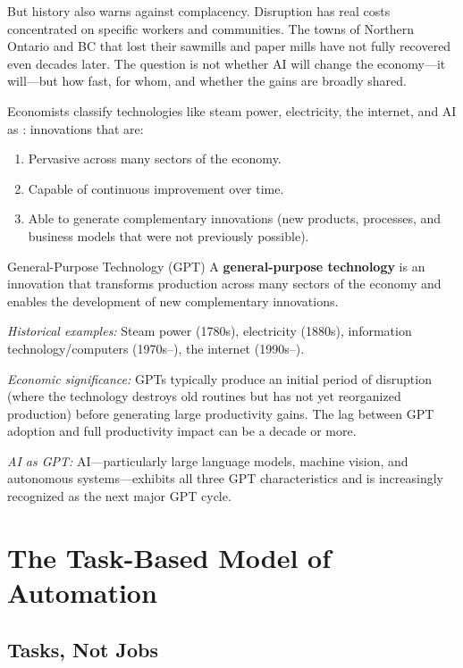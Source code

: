 But history also warns against complacency. Disruption has real costs concentrated on specific workers and communities. The towns of Northern Ontario and BC that lost their sawmills and paper mills have not fully recovered even decades later. The question is not whether AI will change the economy---it will---but how fast, for whom, and whether the gains are broadly shared.

Economists classify technologies like steam power, electricity, the internet, and AI as : innovations that are:
\begin{enumerate}
  \item Pervasive across many sectors of the economy.
  \item Capable of continuous improvement over time.
  \item Able to generate complementary innovations (new products, processes, and business models that were not previously possible).
\end{enumerate}

\begin{defbox}{General-Purpose Technology (GPT)}
A \textbf{general-purpose technology} is an innovation that transforms production across many sectors of the economy and enables the development of new complementary innovations.

\textit{Historical examples:} Steam power (1780s), electricity (1880s), information technology/computers (1970s--), the internet (1990s--).

\textit{Economic significance:} GPTs typically produce an initial period of disruption (where the technology destroys old routines but has not yet reorganized production) before generating large productivity gains. The lag between GPT adoption and full productivity impact can be a decade or more.

\textit{AI as GPT:} AI---particularly large language models, machine vision, and autonomous systems---exhibits all three GPT characteristics and is increasingly recognized as the next major GPT cycle.
\end{defbox}

\section{The Task-Based Model of Automation}

\subsection{Tasks, Not Jobs}

